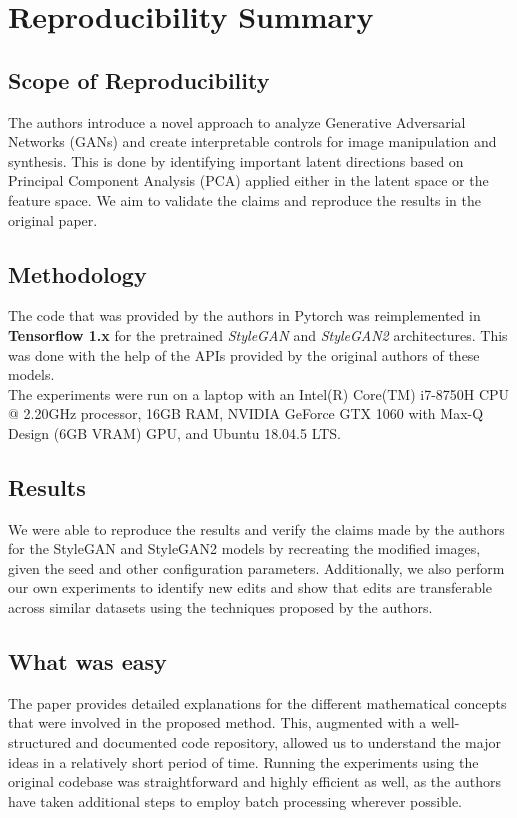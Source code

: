 \section*{Reproducibility Summary}

\subsection*{Scope of Reproducibility}

The authors introduce a novel approach to analyze Generative Adversarial Networks (GANs) and create interpretable controls for image manipulation and synthesis. This is done by identifying important latent directions based on Principal Component Analysis (PCA) applied either in the latent space or the feature space. We aim to validate the claims and reproduce the results in the original paper.

\subsection*{Methodology}

The code that was provided by the authors in Pytorch was reimplemented in \textbf{Tensorflow 1.x} for the pretrained \textit{StyleGAN} and \textit{StyleGAN2} architectures. This was done with the help of the APIs provided by the original authors of these models.
\\
The experiments were run on a laptop with an Intel(R) Core(TM) i7-8750H CPU @ 2.20GHz processor, 16GB RAM, NVIDIA GeForce GTX 1060 with Max-Q Design (6GB VRAM) GPU, and Ubuntu 18.04.5 LTS.

\subsection*{Results}

We were able to reproduce the results and verify the claims made by the authors for the StyleGAN and StyleGAN2 models by recreating the modified images, given the seed and other configuration parameters.
Additionally, we also perform our own experiments to identify new edits and show that edits are transferable across similar datasets using the techniques proposed by the authors.

\subsection*{What was easy}

The paper provides detailed explanations for the different mathematical concepts that were involved in the proposed method. This, augmented with a well-structured and documented code repository, allowed us to understand the major ideas in a relatively short period of time. Running the experiments using the original codebase was straightforward and highly efficient as well, as the authors have taken additional steps to employ batch processing wherever possible.

